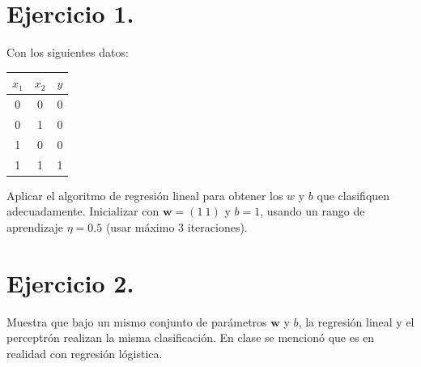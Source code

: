\documentclass[12pt,letterpaper]{article}
\begin{document}


\newpage

\tableofcontents

\newpage

\section{Ejercicio 1.}

Con los siguientes datos:
\begin{table}[h!]
  \centering
  \begin{tabular}{ccc}
    \toprule
    $x_1$ & $x_2$ & $y$ \\
    \midrule
    0 & 0 & 0 \\
    0 & 1 & 0 \\
    1 & 0 & 0 \\
    1 & 1 & 1 \\
    \bottomrule
  \end{tabular}
\end{table}

Aplicar el algoritmo de regresión lineal para obtener los $w$ y $b$ que clasifiquen adecuadamente. Inicializar con $\mathbf{w} = (1\ 1)$ y $b = 1$, usando un rango de aprendizaje $\eta = 0.5$ (usar máximo 3 iteraciones).

     
\bigskip



\newpage

\section{Ejercicio 2.}
Muestra que bajo un mismo conjunto de parámetros $\mathbf{w}$ y $b$, la regresión lineal y el perceptrón realizan la misma clasificación. En clase se mencionó que es en realidad con regresión lógistica.
\bigskip




\newpage
\end{document}
